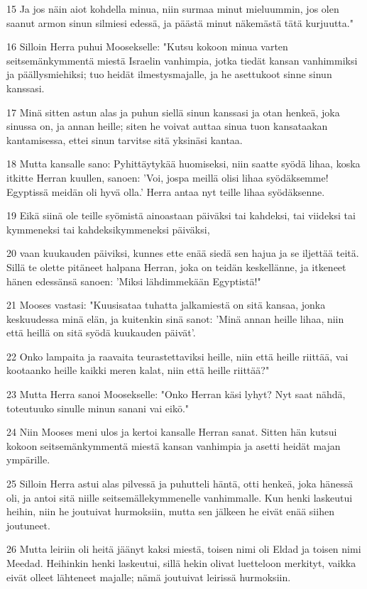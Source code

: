\par 15 Ja jos näin aiot kohdella minua, niin surmaa minut mieluummin, jos olen saanut armon sinun silmiesi edessä, ja päästä minut näkemästä tätä kurjuutta."
\par 16 Silloin Herra puhui Moosekselle: "Kutsu kokoon minua varten seitsemänkymmentä miestä Israelin vanhimpia, jotka tiedät kansan vanhimmiksi ja päällysmiehiksi; tuo heidät ilmestysmajalle, ja he asettukoot sinne sinun kanssasi.
\par 17 Minä sitten astun alas ja puhun siellä sinun kanssasi ja otan henkeä, joka sinussa on, ja annan heille; siten he voivat auttaa sinua tuon kansataakan kantamisessa, ettei sinun tarvitse sitä yksinäsi kantaa.
\par 18 Mutta kansalle sano: Pyhittäytykää huomiseksi, niin saatte syödä lihaa, koska itkitte Herran kuullen, sanoen: 'Voi, jospa meillä olisi lihaa syödäksemme! Egyptissä meidän oli hyvä olla.' Herra antaa nyt teille lihaa syödäksenne.
\par 19 Eikä siinä ole teille syömistä ainoastaan päiväksi tai kahdeksi, tai viideksi tai kymmeneksi tai kahdeksikymmeneksi päiväksi,
\par 20 vaan kuukauden päiviksi, kunnes ette enää siedä sen hajua ja se iljettää teitä. Sillä te olette pitäneet halpana Herran, joka on teidän keskellänne, ja itkeneet hänen edessänsä sanoen: 'Miksi lähdimmekään Egyptistä!"
\par 21 Mooses vastasi: "Kuusisataa tuhatta jalkamiestä on sitä kansaa, jonka keskuudessa minä elän, ja kuitenkin sinä sanot: 'Minä annan heille lihaa, niin että heillä on sitä syödä kuukauden päivät'.
\par 22 Onko lampaita ja raavaita teurastettaviksi heille, niin että heille riittää, vai kootaanko heille kaikki meren kalat, niin että heille riittää?"
\par 23 Mutta Herra sanoi Moosekselle: "Onko Herran käsi lyhyt? Nyt saat nähdä, toteutuuko sinulle minun sanani vai eikö."
\par 24 Niin Mooses meni ulos ja kertoi kansalle Herran sanat. Sitten hän kutsui kokoon seitsemänkymmentä miestä kansan vanhimpia ja asetti heidät majan ympärille.
\par 25 Silloin Herra astui alas pilvessä ja puhutteli häntä, otti henkeä, joka hänessä oli, ja antoi sitä niille seitsemällekymmenelle vanhimmalle. Kun henki laskeutui heihin, niin he joutuivat hurmoksiin, mutta sen jälkeen he eivät enää siihen joutuneet.
\par 26 Mutta leiriin oli heitä jäänyt kaksi miestä, toisen nimi oli Eldad ja toisen nimi Meedad. Heihinkin henki laskeutui, sillä hekin olivat luetteloon merkityt, vaikka eivät olleet lähteneet majalle; nämä joutuivat leirissä hurmoksiin.
